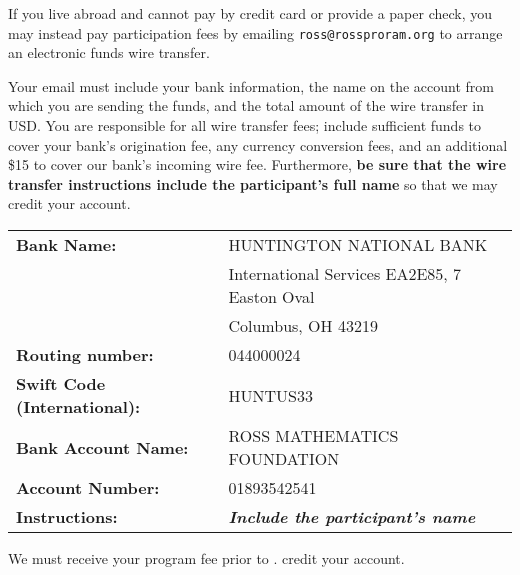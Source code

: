 \documentclass[11pt]{ross}
\begin{document}
If you live abroad and cannot pay by credit card or provide a paper
check, you may instead pay participation fees by emailing
\texttt{ross@rossproram.org} to arrange an electronic funds wire
transfer.

Your email must include your bank information, the name on the account
from which you are sending the funds, and the total amount of the wire
transfer in USD.  You are responsible for all wire transfer fees;
include sufficient funds to cover your bank's origination fee, any
currency conversion fees, and an additional \$15 to cover our bank's
incoming wire fee.  Furthermore, \textbf{be sure that the wire
  transfer instructions include the participant's full name} so that
we may credit your account.

\begin{tabular}{ll}
  \textbf{Bank Name:} &  HUNTINGTON NATIONAL BANK \\
&  International Services EA2E85, 7 Easton Oval \\
&  Columbus, OH 43219   \\
\textbf{Routing number:} &  044000024 \\
\textbf{Swift Code (International):} & HUNTUS33 \\
\textbf{Bank Account Name:} & ROSS MATHEMATICS FOUNDATION \\
\textbf{Account Number:} &  01893542541 \\
  \textbf{Instructions:} &  \textit{\textbf{Include the participant's name}} \\
\end{tabular}

We must receive your program fee prior to \feeduedate.
credit your account.
\end{document}
